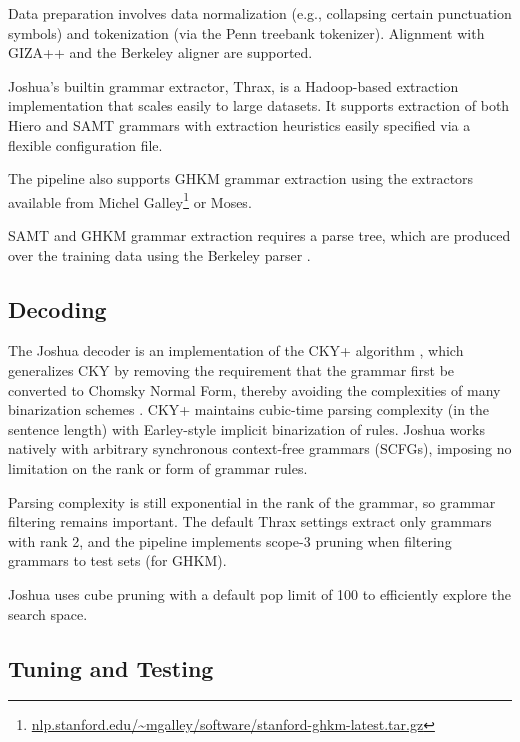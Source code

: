 \documentclass[11pt]{article}
\begin{document}
Data preparation involves data normalization (e.g., collapsing certain
punctuation symbols) and tokenization (via the Penn treebank
tokenizer).  Alignment with GIZA++ \cite{giza} and the Berkeley aligner
\cite{berkeley-aligner} are supported.

Joshua's builtin grammar extractor, Thrax, is a Hadoop-based
extraction implementation that scales easily to large datasets. It
supports extraction of both Hiero \cite{Chiang2005} and SAMT grammars
\cite{samt2006} with extraction heuristics easily specified via a
flexible configuration file.

The pipeline also supports GHKM grammar extraction \cite{galley2006scalable} using the
extractors available from Michel
Galley\footnote{\url{nlp.stanford.edu/~mgalley/software/stanford-ghkm-latest.tar.gz}}
or Moses.

SAMT and GHKM grammar extraction requires a parse tree, which are
produced over the training data using the Berkeley parser \cite{petrov2006learning}.

\subsection{Decoding}

The Joshua decoder is an implementation of the CKY+ algorithm
\cite{chappelier1998generalized}, which generalizes CKY by removing
the requirement that the grammar first be converted to Chomsky Normal
Form, thereby avoiding the complexities of many binarization schemes
\cite{zhang2006synchronous,denero2009asynchronous}. CKY+ maintains
cubic-time parsing complexity (in the sentence length) with
Earley-style implicit binarization of rules. Joshua works natively
with arbitrary synchronous context-free grammars (SCFGs), imposing no
limitation on the rank or form of grammar rules. 

Parsing complexity is still exponential in the rank of the grammar, so
grammar filtering remains important.  The default Thrax settings
extract only grammars with rank 2, and the pipeline implements scope-3
pruning \cite{hopkins2010scfg} when filtering grammars to test sets
(for GHKM). 

Joshua uses cube pruning \cite{Chiang2007} with a default pop limit of
100 to efficiently explore the search space.

\subsection{Tuning and Testing}
\end{document}
